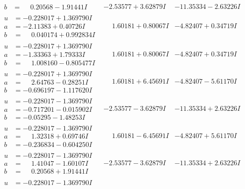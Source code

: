 \documentclass[1p]{elsarticle_modified}
\theoremstyle{definition}
\begin{document}
$$\begin{array}{c|c|c}
\begin{aligned}
b &= \phantom{-}0.20568 - 1.91441 I\end{aligned}
 & -2.53577 + 3.62879 I & -11.35334 - 2.63226 I \\ \hline\begin{aligned}
u &= -0.228017 + 1.369790 I \\
a &= -2.11383 + 0.40726 I \\
b &= \phantom{-}0.040174 + 0.992834 I\end{aligned}
 & \phantom{-}1.60181 + 0.80067 I & -4.82407 + 0.34719 I \\ \hline\begin{aligned}
u &= -0.228017 + 1.369790 I \\
a &= -1.33363 + 1.79333 I \\
b &= \phantom{-}1.008160 - 0.805477 I\end{aligned}
 & \phantom{-}1.60181 + 0.80067 I & -4.82407 + 0.34719 I \\ \hline\begin{aligned}
u &= -0.228017 + 1.369790 I \\
a &= \phantom{-}2.64763 - 0.28251 I \\
b &= -0.696197 - 1.117620 I\end{aligned}
 & \phantom{-}1.60181 + 6.45691 I & -4.82407 - 5.61170 I \\ \hline\begin{aligned}
u &= -0.228017 - 1.369790 I \\
a &= -0.717201 - 0.015902 I \\
b &= -0.05295 - 1.48253 I\end{aligned}
 & -2.53577 - 3.62879 I & -11.35334 + 2.63226 I \\ \hline\begin{aligned}
u &= -0.228017 - 1.369790 I \\
a &= \phantom{-}1.32318 + 0.69746 I \\
b &= -0.236834 - 0.604250 I\end{aligned}
 & \phantom{-}1.60181 - 6.45691 I & -4.82407 + 5.61170 I \\ \hline\begin{aligned}
u &= -0.228017 - 1.369790 I \\
a &= \phantom{-}1.41047 - 1.60107 I \\
b &= \phantom{-}0.20568 + 1.91441 I\end{aligned}
 & -2.53577 - 3.62879 I & -11.35334 + 2.63226 I \\ \hline\begin{aligned}
u &= -0.228017 - 1.369790 I \\

\end{aligned}
\end{array}$$
\end{document}
